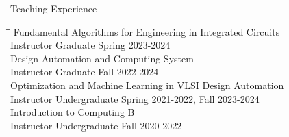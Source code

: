 \begin{rSection}{Teaching Experience}

\begin{tabbing}
\hspace{3.5in}\= \hspace{1.5in}\= \kill
Fundamental Algorithms for Engineering in Integrated Circuits  \\
  Instructor \> Graduate \> \hfill {Spring 2023-2024} \\
Design Automation and Computing System \\
  Instructor \> Graduate \> \hfill {Fall 2022-2024} \\
Optimization and Machine Learning in VLSI Design Automation \\
  Instructor \> Undergraduate \> \hfill {Spring 2021-2022, Fall 2023-2024} \\
Introduction to Computing B \\
  Instructor \> Undergraduate \> \hfill {Fall 2020-2022} \\
\end{tabbing}

\end{rSection}
